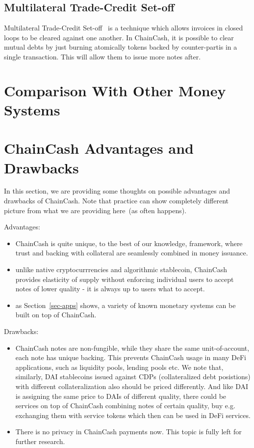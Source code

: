 \documentclass{llncs}   %
\newcommand{\cc}{ChainCash}
\begin{document}
\subsection{Multilateral Trade-Credit Set-off}

Multilateral Trade-Credit Set-off~\cite{mtcs} is a technique which allows invoices in closed loops to be cleared against one another.
In \cc{}, it is possible to clear mutual debts by just burning atomically tokens backed by counter-partis in a single
transaction. This will allow them to issue more notes after.

\section{Comparison With Other Money Systems}
\label{sec-comparison}

\section{\cc{} Advantages and Drawbacks}

In this section, we are providing some thoughts on possible advantages and drawbacks of \cc{}. Note that practice can show
completely different picture from what we are providing here~(as often happens).

Advantages:
\begin{itemize}
  \item ChainCash is quite unique, to the best of our knowledge, framework, where trust and backing with collateral are
   seamlessly combined in money issuance.
  \item unlike native cryptocurrrencies and algorithmic stablecoin, \cc{} provides elasticity of supply without enforcing
  individual users to accept notes of lower quality - it is always up to users what to accept.
  \item as Section~\ref{sec-apps} shows, a variety of known monetary systems can be built on top of \cc{}.
\end{itemize}

Drawbacks:
\begin{itemize}
  \item ChainCash notes are non-fungible, while they share the same unit-of-account, each note has unique backing. This prevents ChainCash usage
  in many DeFi applications, such as liquidity pools, lending pools etc. We note that, similarly, DAI stablecoins issued against CDPs
  (collateralized debt posistions) with different collateralization also should be priced differently. And like DAI is assigning the same price to
  DAIs of different quality, there could be services on top of \cc{} combining notes of certain quality, buy e.g. exchanging them with service tokens
  which then can be used in DeFi services.
  \item There is no privacy in \cc{} payments now. This topic is fully left for further research.
\end{itemize}


\newpage

 
\end{document}
